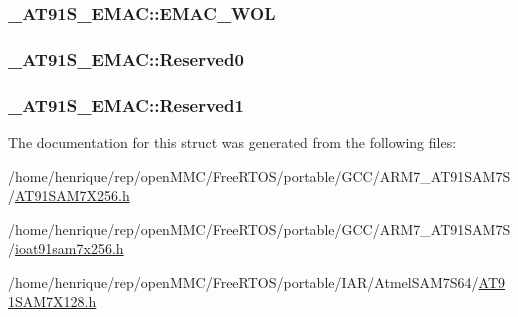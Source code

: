 \hypertarget{struct__AT91S__EMAC_a0beaeb7cb794ede456613b75abc0b101}{
\subsubsection[{E\-M\-A\-C\-\_\-\-W\-O\-L}]{ \-\_\-\-A\-T91\-S\-\_\-\-E\-M\-A\-C\-::\-E\-M\-A\-C\-\_\-\-W\-O\-L}}\label{struct__AT91S__EMAC_a0beaeb7cb794ede456613b75abc0b101}
\hypertarget{struct__AT91S__EMAC_afe82bab0fca2b9327958105138c7ceb9}{
\subsubsection[{Reserved0}]{ \-\_\-\-A\-T91\-S\-\_\-\-E\-M\-A\-C\-::\-Reserved0}}\label{struct__AT91S__EMAC_afe82bab0fca2b9327958105138c7ceb9}
\hypertarget{struct__AT91S__EMAC_ad18629e06269c2dd5e5fa739f477b9bd}{
\subsubsection[{Reserved1}]{ \-\_\-\-A\-T91\-S\-\_\-\-E\-M\-A\-C\-::\-Reserved1}}\label{struct__AT91S__EMAC_ad18629e06269c2dd5e5fa739f477b9bd}


The documentation for this struct was generated from the following files\-:\begin{DoxyCompactItemize}
\item 
/home/henrique/rep/open\-M\-M\-C/\-Free\-R\-T\-O\-S/portable/\-G\-C\-C/\-A\-R\-M7\-\_\-\-A\-T91\-S\-A\-M7\-S/\hyperlink{GCC_2ARM7__AT91SAM7S_2AT91SAM7X256_8h}{A\-T91\-S\-A\-M7\-X256.\-h}\item 
/home/henrique/rep/open\-M\-M\-C/\-Free\-R\-T\-O\-S/portable/\-G\-C\-C/\-A\-R\-M7\-\_\-\-A\-T91\-S\-A\-M7\-S/\hyperlink{ioat91sam7x256_8h}{ioat91sam7x256.\-h}\item 
/home/henrique/rep/open\-M\-M\-C/\-Free\-R\-T\-O\-S/portable/\-I\-A\-R/\-Atmel\-S\-A\-M7\-S64/\hyperlink{AT91SAM7X128_8h}{A\-T91\-S\-A\-M7\-X128.\-h}\end{DoxyCompactItemize}
